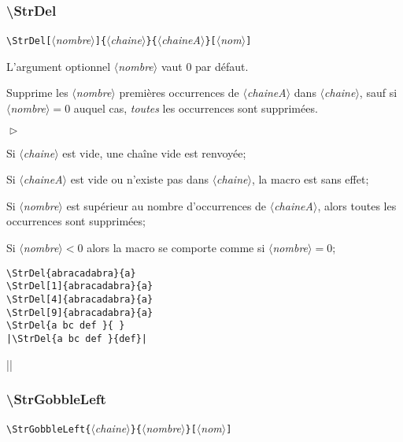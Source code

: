\documentclass[a4paper,10pt]{article}
\newcommand\argu[1]{$\langle$\textit{#1}$\rangle$}
\newcommand\ARGU[1]{\texttt{\color{black}\{}\argu{#1}\texttt{\color{black}\}}}
\newcommand\arguC[1]{\texttt{\color{black}[}\argu{#1}\texttt{\color{black}]}}
\newenvironment{Conditions}[1][1cm]%
{\begin{list}%
	{$\vartriangleright$}%
	{\setlength{\leftmargin}{#1}
	 \setlength{\itemsep}{0pt}
	 \setlength{\parsep}{0pt}
	 \setlength{\topsep}{2ptplus3ptminus2pt}
	}}%
{\end{list}}
\newcommand\styleexemple{\small\vskip4pt}
\newcommand\verbinline{\lstinline[basicstyle=\normalsize\ttfamily]}
\begin{document}
\subsubsection{\ttfamily\textbackslash StrDel}
\verbinline|\StrDel|\arguC{nombre}\ARGU{chaine}\ARGU{chaineA}\arguC{nom}
\smallskip

L'argument optionnel \argu{nombre} vaut 0 par défaut.\par\nobreak\smallskip
Supprime les \argu{nombre} premières occurrences de \argu{chaineA} dans \argu{chaine}, sauf si \argu{nombre}${}=0$ auquel cas, \emph{toutes} les occurrences sont supprimées.\medskip

\begin{Conditions}
	\item Si \argu{chaine} est vide, une chaîne vide est renvoyée;
	\item Si \argu{chaineA} est vide ou n'existe pas dans \argu{chaine}, la macro est sans effet;
	\item Si \argu{nombre} est supérieur au nombre d'occurrences de \argu{chaineA}, alors toutes les occurrences sont supprimées;
	\item Si \argu{nombre}${}<0$ alors la macro se comporte comme si \argu{nombre}${}=0$;
\end{Conditions}

\begin{minipage}[t]{0.65\linewidth}
\begin{lstlisting}
\StrDel{abracadabra}{a}
\StrDel[1]{abracadabra}{a}
\StrDel[4]{abracadabra}{a}
\StrDel[9]{abracadabra}{a}
\StrDel{a bc def }{ }
|\StrDel{a bc def }{def}|
\end{lstlisting}%
\end{minipage}\hfill
\begin{minipage}[t]{0.35\linewidth}
	\styleexemple
	\par
	\par
	\par
	\par
	\par
	||
\end{minipage}%

\subsubsection{\ttfamily\textbackslash StrGobbleLeft}
\verbinline|\StrGobbleLeft|\ARGU{chaine}\ARGU{nombre}\arguC{nom}
\smallskip
\end{document}
